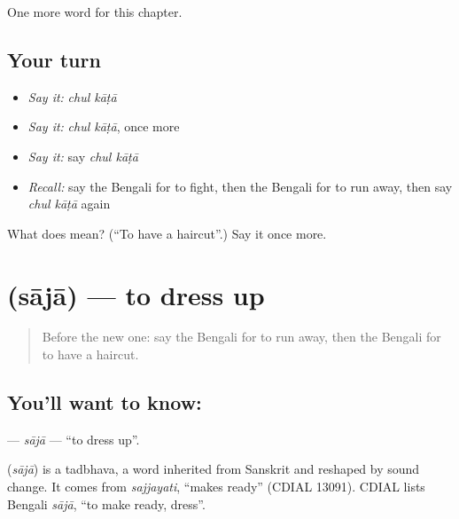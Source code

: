 \begin{grammarlens}[title={What you've built}]
One more word for this chapter.
\end{grammarlens}

\subsection*{Your turn}
\begin{itemize}
\raggedright
  \item \emph{Say it:} \emph{chul kāṭā}
  \item \emph{Say it:} \emph{chul kāṭā}, once more
  \item \emph{Say it:} say \emph{chul kāṭā}
  \item \emph{Recall:} say the Bengali for to fight, then the Bengali for to run away, then say \emph{chul kāṭā} again
\end{itemize}

\begin{tcolorbox}[breakable,colback=teal!4,colframe=teal!35!black,title={Before you move on}]
What does   mean? (\textquotedblleft{}To have a haircut\textquotedblright{}.) Say it once more.
\end{tcolorbox}
\section[\texorpdfstring{\bn{সাজা} (sājā)}{সাজা (sājā)}]{ (sājā) — to dress up}

\label{lesson:BN-C213-saja}



\begin{quote}
Before the new one: say the Bengali for to run away, then the Bengali for to have a haircut.
\end{quote}

\subsection*{You'll want to know: }
\textbf{} — \emph{sājā} — \textquotedblleft{}to dress up\textquotedblright{}.

\begin{cousinweb}
\textbf{} (\emph{sājā}) is a tadbhava, a word inherited from Sanskrit and reshaped by sound change. It comes from \emph{sajjayati}, \textquotedblleft{}makes ready\textquotedblright{} (CDIAL 13091). CDIAL lists Bengali \emph{sājā}, \textquotedblleft{}to make ready, dress\textquotedblright{}.
\end{cousinweb}

